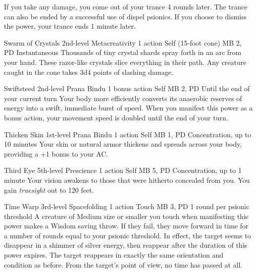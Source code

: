   If you take any damage,
  you come out of your trance 4 rounds later.
  The trance can also be ended by a
  successful use of dispel psionics.
  If you choose to dismiss the power,
  your trance ends 1 minute later.

\DndPowerHeader%
  {Swarm of Crystals}
  {2nd-level Metacreativity}
  {1 action}
  {Self (15-foot cone)}
  {MB 2, PD \lvltwo}
  {Instantaneous}
  Thousands of tiny crystal shards spray forth in an arc from your hand.
  These razor-like crystals slice everything in their path.
  Any creature caught in the cone takes 3d4 points of slashing damage.

\DndPowerHeader%
  {Swiftsteed}
  {2nd-level Prana Bindu}
  {1 bonus action}
  {Self}
  {MB 2, PD \lvltwo}
  {Until the end of your current turn}
  Your body more efficiently converts its anaerobic
  reserves of energy into a swift, immediate burst of speed.
  When you manifest this power as a bonus action,
  your movement speed is doubled until the end
  of your turn.

\DndPowerHeader%
  {Thicken Skin}
  {1st-level Prana Bindu}
  {1 action}
  {Self}
  {MB 1, PD \lvlone}
  {Concentration, up to 10 minutes}
  Your skin or natural armor thickens
  and spreads across your body,
  providing a +1 bonus to your AC.

\DndPowerHeader%
  {Third Eye}
  {5th-level Prescience}
  {1 action}
  {Self}
  {MB 5, PD \lvlfive}
  {Concentration, up to 1 minute}
Your vision awakens to those that were hitherto
concealed from you.
You gain \emph{truesight} out to 120 feet.

\DndPowerHeader%
  {Time Warp}
  {3rd-level Spacefolding}
  {1 action}
  {Touch}
  {MB 3, PD \lvlthree}
  {1 round per psionic threshold}
  A creature of Medium size or smaller
  you touch when manifesting this power makes a Wisdom saving throw.
  If they fail, they move forward in time for a number of rounds
  equal to your psionic threshold.
  In effect, the target seems to disappear in a shimmer
  of silver energy,
  then reappear after the duration of this power expires.
  The target reappears in exactly the same
  orientation and condition as before.
  From the target's point of view,
  no time has passed at all.

